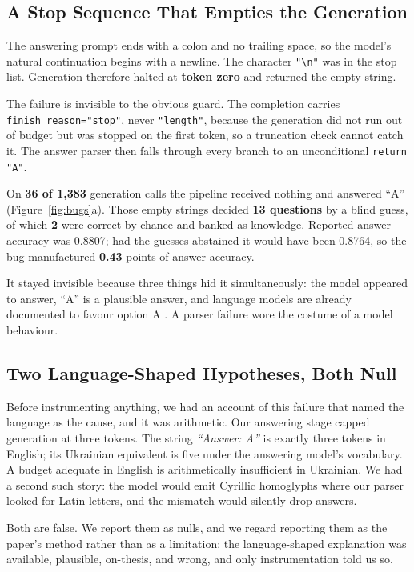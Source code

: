 \documentclass{article}
\begin{document}
\subsection{A Stop Sequence That Empties the Generation}
\label{sec:stop}

The answering prompt ends with a colon and no trailing space, so the model's natural continuation begins with a newline. The character \verb|"\n"| was in the stop list. Generation therefore halted at \textbf{token zero} and returned the empty string.

The failure is invisible to the obvious guard. The completion carries \verb|finish_reason="stop"|, never \verb|"length"|, because the generation did not run out of budget but was stopped on the first token, so a truncation check cannot catch it. The answer parser then falls through every branch to an unconditional \verb|return "A"|.

On \textbf{36 of 1,383} generation calls the pipeline received nothing and answered ``A'' (Figure~\ref{fig:bugs}a). Those empty strings decided \textbf{13 questions} by a blind guess, of which \textbf{2} were correct by chance and banked as knowledge. Reported answer accuracy was 0.8807; had the guesses abstained it would have been 0.8764, so the bug manufactured \textbf{0.43} points of answer accuracy.

It stayed invisible because three things hid it simultaneously: the model appeared to answer, ``A'' is a plausible answer, and language models are already documented to favour option A \cite{zheng2024selectors}. A parser failure wore the costume of a model behaviour.

\subsection{Two Language-Shaped Hypotheses, Both Null}
\label{sec:nulls}

Before instrumenting anything, we had an account of this failure that named the language as the cause, and it was arithmetic. Our answering stage capped generation at three tokens. The string \emph{``Answer: A''} is exactly three tokens in English; its Ukrainian equivalent is five under the answering model's vocabulary. A budget adequate in English is arithmetically insufficient in Ukrainian. We had a second such story: the model would emit Cyrillic homoglyphs where our parser looked for Latin letters, and the mismatch would silently drop answers.

Both are false. We report them as nulls, and we regard reporting them as the paper's method rather than as a limitation: the language-shaped explanation was available, plausible, on-thesis, and wrong, and only instrumentation told us so.
\end{document}
